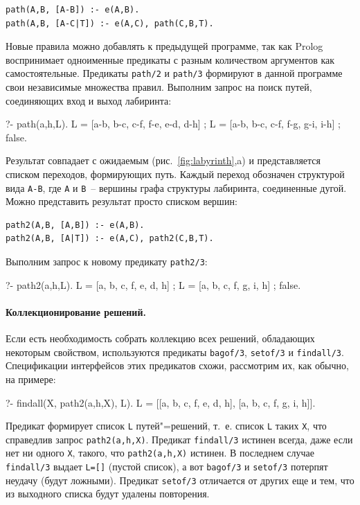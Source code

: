 \documentclass[a4paper,14pt, openany, twoside, final]{extbook} %
\begin{document}
\begin{verbatim}
path(A,B, [A-B]) :- e(A,B).
path(A,B, [A-C|T]) :- e(A,C), path(C,B,T).
\end{verbatim}

  Новые правила можно добавлять к предыдущей программе, так как Prolog воспринимает одноименные предикаты с разным количеством аргументов как самостоятельные.  Предикаты \texttt{path/2} и \texttt{path/3} формируют в данной программе свои независимые множества правил.  Выполним запрос на поиск путей, соединяющих вход и выход лабиринта:

\begin{proexp}
?- path(a,h,L).
L = [a-b, b-c, c-f, f-e, e-d, d-h] ;
L = [a-b, b-c, c-f, f-g, g-i, i-h] ;
false.
\end{proexp}

Результат совпадает с ожидаемым (рис.~\ref{fig:labyrinth},a) и представляется списком переходов, формирующих путь.  Каждый переход обозначен структурой вида \texttt{A-B}, где \texttt{A} и \texttt{B}~-- вершины графа структуры лабиринта, соединенные дугой.  Можно представить результат просто списком вершин:

\begin{verbatim}
path2(A,B, [A,B]) :- e(A,B).
path2(A,B, [A|T]) :- e(A,C), path2(C,B,T).
\end{verbatim}

\noindent{}Выполним запрос к новому предикату \texttt{path2/3}:

\begin{proexp}
?- path2(a,h,L).
L = [a, b, c, f, e, d, h] ;
L = [a, b, c, f, g, i, h] ;
false.
\end{proexp}

\paragraph{Коллекционирование решений.} Если есть необходимость собрать коллекцию всех решений, обладающих некоторым свойством, используются предикаты \texttt{bagof/3}, \texttt{setof/3} и \texttt{findall/3}.  Спецификации интерфейсов этих предикатов схожи, рассмотрим их, как обычно, на примере:

\begin{proexp}
?- findall(X, path2(a,h,X), L).
L = [[a, b, c, f, e, d, h], [a, b, c, f, g, i, h]].
\end{proexp}

\noindent{}Предикат формирует список \texttt{L} путей"=решений, т.~е. список \texttt{L} таких \texttt{X}, что справедлив запрос \texttt{path2(a,h,X)}.  Предикат \texttt{findall/3} истинен всегда, даже если нет ни одного \texttt{X}, такого, что \texttt{path2(a,h,X)} истинен.  В последнем случае \texttt{findall/3} выдает \texttt{L=[]} (пустой список), а вот \texttt{bagof/3} и \texttt{setof/3} потерпят неудачу (будут ложными).  Предикат \texttt{setof/3} отличается от других еще и тем, что из выходного списка будут удалены повторения.
\end{document}
